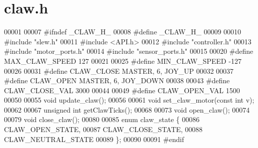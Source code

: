 \section{claw.\+h}
\label{claw_8h_source}

\begin{DoxyCode}
00001 
00007 \textcolor{preprocessor}{#ifndef \_CLAW\_H\_}
00008 \textcolor{preprocessor}{#define \_CLAW\_H\_}
00009 
00010 \textcolor{preprocessor}{#include "slew.h"}
00011 \textcolor{preprocessor}{#include <API.h>}
00012 \textcolor{preprocessor}{#include "controller.h"}
00013 \textcolor{preprocessor}{#include "motor_ports.h"}
00014 \textcolor{preprocessor}{#include "sensor_ports.h"}
00015 
00020 \textcolor{preprocessor}{#define MAX\_CLAW\_SPEED 127}
00021 
00025 \textcolor{preprocessor}{#define MIN\_CLAW\_SPEED -127}
00026 
00031 \textcolor{preprocessor}{#define CLAW\_CLOSE MASTER, 6, JOY\_UP}
00032 
00037 \textcolor{preprocessor}{#define CLAW\_OPEN MASTER, 6, JOY\_DOWN}
00038 
00043 \textcolor{preprocessor}{#define CLAW\_CLOSE\_VAL 3000}
00044 
00049 \textcolor{preprocessor}{#define CLAW\_OPEN\_VAL 1500}
00050 
00055 \textcolor{keywordtype}{void} update_claw();
00056 
00061 \textcolor{keywordtype}{void} set_claw_motor(\textcolor{keyword}{const} \textcolor{keywordtype}{int} v);
00062 
00067 \textcolor{keywordtype}{unsigned} \textcolor{keywordtype}{int} getClawTicks();
00068 
00073 \textcolor{keywordtype}{void} open_claw();
00074 
00079 \textcolor{keywordtype}{void} close_claw();
00080 
00085 \textcolor{keyword}{enum} claw_state \{
00086   CLAW_OPEN_STATE,
00087   CLAW_CLOSE_STATE,
00088   CLAW_NEUTRAL_STATE
00089 \};
00090 
00091 \textcolor{preprocessor}{#endif}
\end{DoxyCode}
